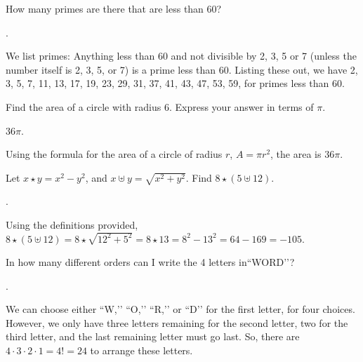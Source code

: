 \documentclass[11pt]{article}
\begin{document}
\begin{problem}
\end{problem}


\begin{problem}How many primes are there that are less than 60?
\end{problem}

.
\begin{solution}
We list primes: Anything less than 60 and not divisible by 2, 3, 5 or 7 (unless the number itself is 2, 3, 5, or 7) is a prime less than 60. Listing these out, we have 2, 3, 5, 7, 11, 13, 17, 19, 23, 29, 31, 37, 41, 43, 47, 53, 59, for  primes less than 60.
\end{solution}

\begin{problem}Find the area of a circle with radius 6. Express your answer in terms of $\pi$.
\end{problem}

\answer $36\pi$.
\begin{solution}
Using the formula for the area of a circle of radius $r$, $A = \pi r^2$, the area is $\boxed{36 \pi}$.
\end{solution}

\begin{problem}
Let $x \star y = x^2 - y^2$, and $x \uplus y = \sqrt{x^2 + y^2}$. Find $8 \star (5 \uplus 12)$.
\end{problem}

.
\begin{solution}
Using the definitions provided, $8 \star (5 \uplus 12) = 8 \star \sqrt{12^2 + 5^2} = 8 \star 13 = 8^2 - 13^2 = 64 - 169 = \boxed{-105}.$
\end{solution}

\begin{problem}In how many different orders can I write the 4 letters in``WORD’’?
\end{problem}

.
\begin{solution}
We can choose either ``W,’’ ``O,’’ ``R,’’ or ``D’’ for the first letter, for four choices. However, we only have three letters remaining for the second letter, two for the third letter, and the last remaining letter must go last. So, there are $4 \cdot 3 \cdot 2 \cdot 1 = 4! = \boxed{24}$ to arrange these letters.
\end{solution}
\end{document}
